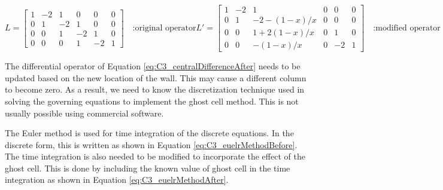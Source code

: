 \begin{subequations}
\begin{equation}\label{eq:C3_centralDifferenceBefore}
    L = 
    \begin{bmatrix}
    1 & -2 & 1 & 0 & 0 & 0 \\
    0 & 1 & -2 & 1 & 0 & 0 \\
    0 & 0 & 1 & -2 & 1 & 0 \\
    0 & 0 & 0 & 1 & -2 & 1
    \end{bmatrix} \quad \text{:original operator}
\end{equation}
\begin{equation}\label{eq:C3_centralDifferenceAfter}
    L' = 
    \begin{bmatrix}
    1 & -2 & 1 & 0 & 0 & 0 \\
    0 & 1 & -2-(1-x)/x & 0 & 0 & 0 \\
    0 & 0 & 1+2(1-x)/x & 0 & 1 & 0 \\
    0 & 0 & -(1-x)/x & 0 & -2 & 1
    \end{bmatrix} \quad \text{:modified operator}
\end{equation}
\end{subequations}

The differential operator of Equation \eqref{eq:C3_centralDifferenceAfter} needs to be updated based on the new location of the wall. This may cause a different column to become zero. As a result, we need to know the discretization technique used in solving the governing equations to implement the ghost cell method. This is not usually possible using commercial software.

The Euler method is used for time integration of the discrete equations. In the discrete form, this is written as shown in Equation \eqref{eq:C3_euelrMethodBefore}. The time integration is also needed to be modified to incorporate the effect of the ghost cell. This is done by including the known value of ghost cell in the time integration as shown in Equation \eqref{eq:C3_euelrMethodAfter}.

